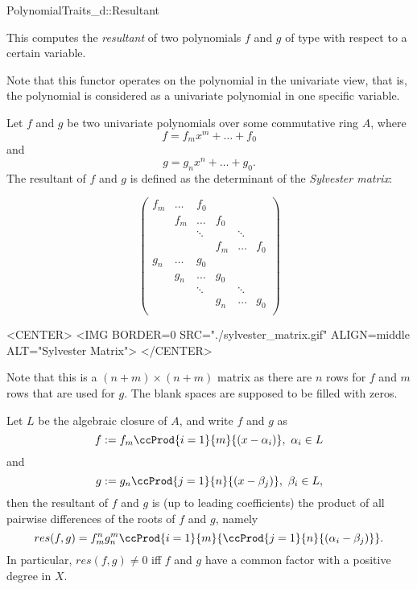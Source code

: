 \begin{ccRefConcept}{PolynomialTraits_d::Resultant}
\ccDefinition

This  computes the {\em resultant} of two polynomials 
$f$ and $g$ of type  with respect to a 
certain variable.
 
Note that this functor operates on the polynomial in the univariate view, 
that is, the polynomial is considered as a univariate polynomial in one 
specific variable. 

Let $f$ and $g$ be two univariate polynomials over some commutative ring $A$, 
where 
\[f = f_mx^m + \dots + f_0\] and 
\[g = g_nx^n + \dots + g_0.\] 
The resultant of $f$ and $g$ is defined as the determinant of the {\em Sylvester matrix}: 

\begin{ccTexOnly}
\[ \left( \begin{array}{cccccccc}
f_m & \dots & f_0&&& \\
&f_m & \dots & f_0&&\\
&&\ddots&&\ddots&\\
&&&f_m &\dots& f_0\\  
g_n & \dots & g_0&&& \\
&g_n & \dots & g_0&&\\
&&\ddots&&\ddots&\\
&&&g_n & \dots& g_0\\  
\end{array} \right) \]
\end{ccTexOnly}

\begin{ccHtmlOnly}
<CENTER>
<IMG BORDER=0 SRC="./sylvester_matrix.gif" ALIGN=middle ALT="Sylvester Matrix">
</CENTER>
\end{ccHtmlOnly}

Note that this is a $(n+m)\times(n+m)$ matrix as there are $n$ rows for $f$ 
and $m$ rows that are used for $g$. The blank spaces are supposed to be 
filled with zeros. 


\begin{ccAdvanced}
Let $L$ be the algebraic closure of $A$, and write $f$ and $g$ as 
\[f := f_m \ccProd{i=1}{m}{(x-\alpha_i)},\ \alpha_i \in L \]
and 
\[g :=  g_n \ccProd{j=1}{n}{(x-\beta_j)},\ \beta_i \in L,\] then
the resultant of $f$ and $g$ is (up to leading coefficients) 
the product of all pairwise differences of the roots of $f$ and $g$, namely 
\[res(f,g) = f_m^n g_n^m \ccProd{i=1}{m}{\ccProd{j=1}{n}{(\alpha_i-\beta_j)}}.\] 
In particular, $res(f,g) \neq 0$ iff $f$ and $g$ have a common factor with a 
positive degree in $X$. %



\end{ccAdvanced}
\end{ccRefConcept}
